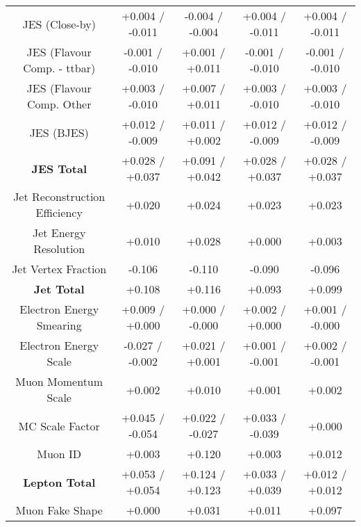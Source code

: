 \begin{table}[htbp]
\begin{center}
\begin{tabular}{|c|c|c|c|c|}
JES (Close-by)                        &+0.004   / -0.011   & -0.004   / -0.004   & +0.004   / -0.011   & +0.004   / -0.011  \\
JES (Flavour Comp. - ttbar)           &-0.001   / -0.010   & +0.001   / +0.011   & -0.001   / -0.010   & -0.001   / -0.010  \\
JES (Flavour Comp. Other              &+0.003   / -0.010   & +0.007   / +0.011   & +0.003   / -0.010   & +0.003   / -0.010  \\
JES (BJES)                            &+0.012   / -0.009   & +0.011   / +0.002   & +0.012   / -0.009   & +0.012   / -0.009  \\
\hline
\textbf{JES Total}                    &+0.028   / +0.037   & +0.091   / +0.042   & +0.028   / +0.037   & +0.028   / +0.037  \\
\hline
Jet Reconstruction Efficiency         &+0.020              & +0.024              & +0.023              & +0.023             \\
Jet Energy Resolution                 &+0.010              & +0.028              & +0.000              & +0.003             \\
Jet Vertex Fraction                   &-0.106              & -0.110              & -0.090              & -0.096             \\
\hline
\textbf{Jet Total}                    &+0.108              & +0.116              & +0.093              & +0.099             \\
\hline
Electron Energy Smearing              &+0.009   / +0.000   & +0.000   / -0.000   & +0.002   / +0.000   & +0.001   / -0.000  \\
Electron Energy Scale                 &-0.027   / -0.002   & +0.021   / +0.001   & +0.001   / -0.001   & +0.002   / -0.001  \\
Muon Momentum Scale                   &+0.002              & +0.010              & +0.001              & +0.002             \\
MC Scale Factor                       &+0.045   / -0.054   & +0.022   / -0.027   & +0.033   / -0.039   & +0.000             \\
Muon ID                               &+0.003              & +0.120              & +0.003              & +0.012             \\
\hline
\textbf{Lepton Total}                 &+0.053   / +0.054   & +0.124   / +0.123   & +0.033   / +0.039   & +0.012   / +0.012  \\
\hline
Muon Fake Shape                       &+0.000              & +0.031              & +0.011              & +0.097             \\

\end{tabular}
\end{center}
\end{table}
